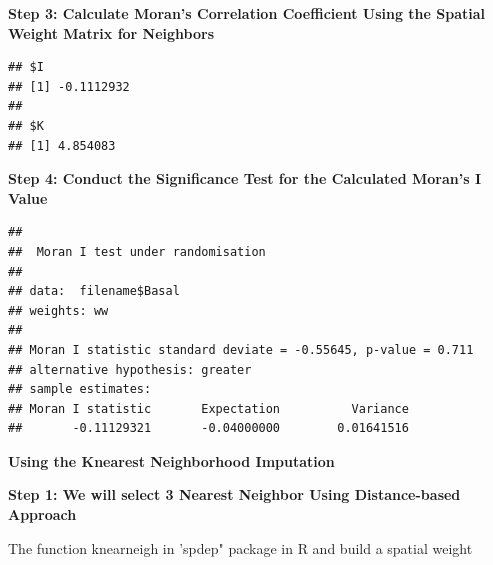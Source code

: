 \documentclass[
]{book}
\newenvironment{Shaded}{\begin{snugshade}}{\end{snugshade}}
\newcommand{\AttributeTok}[1]{\textcolor[rgb]{0.77,0.63,0.00}{#1}}
\newcommand{\CommentTok}[1]{\textcolor[rgb]{0.56,0.35,0.01}{\textit{#1}}}
\newcommand{\DecValTok}[1]{\textcolor[rgb]{0.00,0.00,0.81}{#1}}
\newcommand{\DocumentationTok}[1]{\textcolor[rgb]{0.56,0.35,0.01}{\textbf{\textit{#1}}}}
\newcommand{\FunctionTok}[1]{\textcolor[rgb]{0.00,0.00,0.00}{#1}}
\newcommand{\NormalTok}[1]{#1}
\newcommand{\OtherTok}[1]{\textcolor[rgb]{0.56,0.35,0.01}{#1}}
\newcommand{\SpecialCharTok}[1]{\textcolor[rgb]{0.00,0.00,0.00}{#1}}
\newcommand{\StringTok}[1]{\textcolor[rgb]{0.31,0.60,0.02}{#1}}
\begin{document}
\textbf{Step 3: Calculate Moran's Correlation Coefficient Using the Spatial Weight Matrix for Neighbors}

\begin{Shaded}
\end{Shaded}

\begin{verbatim}
## $I
## [1] -0.1112932
## 
## $K
## [1] 4.854083
\end{verbatim}

\textbf{Step 4: Conduct the Significance Test for the Calculated Moran's I Value}

\begin{Shaded}
\end{Shaded}

\begin{verbatim}
## 
##  Moran I test under randomisation
## 
## data:  filename$Basal  
## weights: ww    
## 
## Moran I statistic standard deviate = -0.55645, p-value = 0.711
## alternative hypothesis: greater
## sample estimates:
## Moran I statistic       Expectation          Variance 
##       -0.11129321       -0.04000000        0.01641516
\end{verbatim}

\textbf{Using the Knearest Neighborhood Imputation}

\textbf{Step 1: We will select 3 Nearest Neighbor Using Distance-based Approach}

The function knearneigh in 'spdep" package in R and build a spatial weight

\begin{Shaded}
\end{Shaded}
\end{document}

